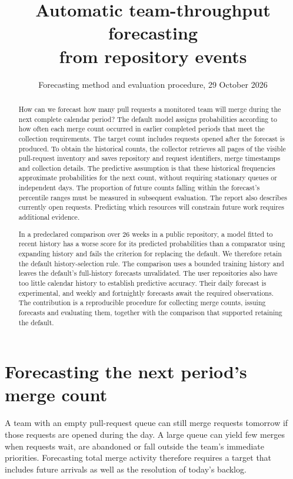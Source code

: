 \documentclass[11pt,a4paper]{article}
\title{Automatic team-throughput forecasting\protect\\from repository events}
\author{}
\date{Forecasting method and evaluation procedure, 29 October 2026}
\begin{document}
\maketitle
\begin{abstract}

How can we forecast how many pull requests a monitored team will merge during the next complete calendar period? The default model assigns probabilities according to how often each merge count occurred in earlier completed periods that meet the collection requirements. The target count includes requests opened after the forecast is produced. To obtain the historical counts, the collector retrieves all pages of the visible pull-request inventory and saves repository and request identifiers, merge timestamps and collection details. The predictive assumption is that these historical frequencies approximate probabilities for the next count, without requiring stationary queues or independent days. The proportion of future counts falling within the forecast's percentile ranges must be measured in subsequent evaluation. The report also describes currently open requests. Predicting which resources will constrain future work requires additional evidence.

In a predeclared comparison over 26 weeks in a public repository, a model fitted to recent history has a worse score for its predicted probabilities than a comparator using expanding history and fails the criterion for replacing the default. We therefore retain the default history-selection rule. The comparison uses a bounded training history and leaves the default's full-history forecasts unvalidated. The user repositories also have too little calendar history to establish predictive accuracy. Their daily forecast is experimental, and weekly and fortnightly forecasts await the required observations. The contribution is a reproducible procedure for collecting merge counts, issuing forecasts and evaluating them, together with the comparison that supported retaining the default.
\end{abstract}

\section{Forecasting the next period's merge count}

A team with an empty pull-request queue can still merge requests tomorrow if those requests are opened during the day. A large queue can yield few merges when requests wait, are abandoned or fall outside the team's immediate priorities. Forecasting total merge activity therefore requires a target that includes future arrivals as well as the resolution of today's backlog.
\end{document}
